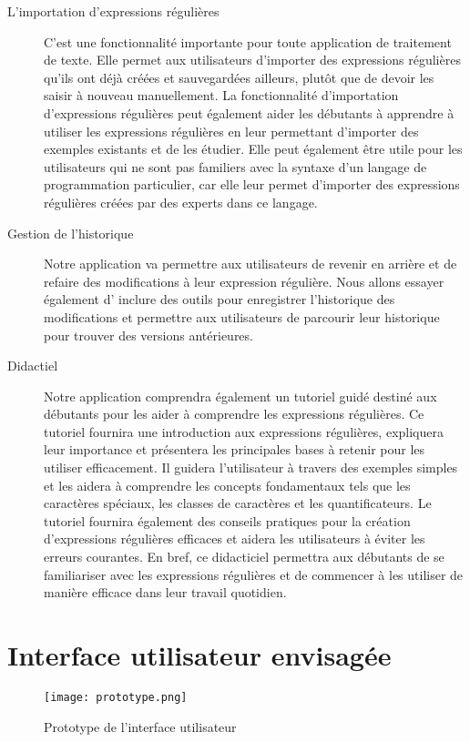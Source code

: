 \documentclass{article}
\begin{document}
\begin{description}
\item[L'importation d'expressions régulières]  C’est une fonctionnalité importante pour toute application de traitement de texte. Elle permet aux utilisateurs d'importer des expressions régulières qu'ils ont déjà créées et sauvegardées ailleurs, plutôt que de devoir les saisir à nouveau manuellement. La fonctionnalité d'importation d'expressions régulières peut également aider les débutants à apprendre à utiliser les expressions régulières en leur permettant d'importer des exemples existants et de les étudier. Elle peut également être utile pour les utilisateurs qui ne sont pas familiers avec la syntaxe d'un langage de programmation particulier, car elle leur permet d'importer des expressions régulières créées par des experts dans ce langage.

\item[Gestion de l'historique] Notre application va permettre aux utilisateurs de revenir en arrière et de refaire des modifications à leur expression régulière. Nous allons essayer également d’ inclure des outils pour enregistrer l'historique des modifications et permettre aux utilisateurs de parcourir leur historique pour trouver des versions antérieures.

\item[Didactiel] Notre application comprendra également un tutoriel guidé destiné aux débutants pour les aider à comprendre les expressions régulières. Ce tutoriel fournira une introduction aux expressions régulières, expliquera leur importance et présentera les principales bases à retenir pour les utiliser efficacement. Il guidera l'utilisateur à travers des exemples simples et les aidera à comprendre les concepts fondamentaux tels que les caractères spéciaux, les classes de caractères et les quantificateurs. Le tutoriel fournira également des conseils pratiques pour la création d'expressions régulières efficaces et aidera les utilisateurs à éviter les erreurs courantes. En bref, ce didacticiel permettra aux débutants de se familiariser avec les expressions régulières et de commencer à les utiliser de manière efficace dans leur travail quotidien.
    \end{description}

    \section{Interface utilisateur envisagée}
    \begin{figure}[H]
        \centering
        \texttt{[image: prototype.png]}
        \caption{Prototype de l'interface utilisateur}
        \label{fig:prototype}
    \end{figure}
\end{document}

